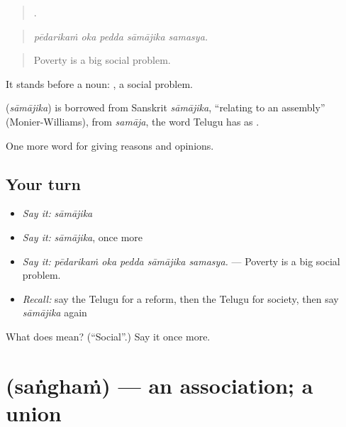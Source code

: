 \begin{quote}
    .
\end{quote}

\begin{quote}
\emph{pēdarikaṁ oka pedda sāmājika samasya.}
\end{quote}

\begin{quote}
Poverty is a big social problem.
\end{quote}

It stands before a noun:  , a social problem.

\begin{cousinweb}
\textbf{} (\emph{sāmājika}) is borrowed from Sanskrit \emph{sāmājika}, \textquotedblleft{}relating to an assembly\textquotedblright{} (Monier-Williams), from \emph{samāja}, the word Telugu has as .
\end{cousinweb}

\begin{grammarlens}[title={What you've built}]
One more word for giving reasons and opinions.
\end{grammarlens}

\subsection*{Your turn}
\begin{itemize}
\raggedright
  \item \emph{Say it:} \emph{sāmājika}
  \item \emph{Say it:} \emph{sāmājika}, once more
  \item \emph{Say it:} \emph{pēdarikaṁ oka pedda sāmājika samasya.} — Poverty is a big social problem.
  \item \emph{Recall:} say the Telugu for a reform, then the Telugu for society, then say \emph{sāmājika} again
\end{itemize}

\begin{tcolorbox}[breakable,colback=teal!4,colframe=teal!35!black,title={Before you move on}]
What does  mean? (\textquotedblleft{}Social\textquotedblright{}.) Say it once more.
\end{tcolorbox}
\section[\texorpdfstring{\te{సంఘం} (saṅghaṁ)}{సంఘం (saṅghaṁ)}]{ (saṅghaṁ) — an association; a union}

